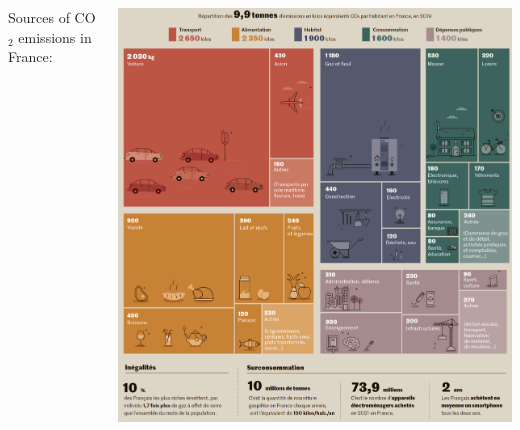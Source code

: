 \begin{frame}
  \begin{scriptsize}
              
  \vspace{-0.1cm}
  \begin{columns}
   Sources of CO$_2$ emissions in France:\\
   \vspace{0.1cm} 

    \begin{center}
        \includegraphics[width=1.0\textwidth]{plots/co2_breakdown.png}
    \end{center}
  \end{columns}

  \end{scriptsize}
  \end{frame}